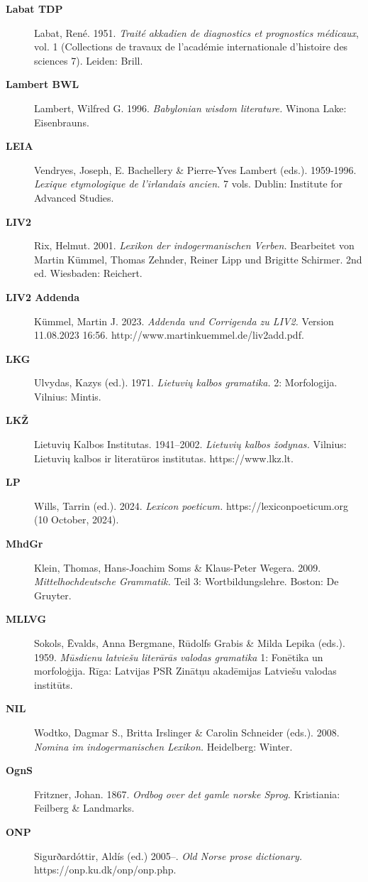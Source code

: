 \begin{description}
\item[\bfseries\upshape Labat TDP]Labat, René. 1951. \emph{Traité akkadien de diagnostics et prognostics médicaux}, vol. 1 (Collections de travaux de l’académie internationale d’histoire des sciences 7). Leiden: Brill.
\item[\bfseries\upshape Lambert BWL]Lambert, Wilfred G. 1996. \emph{Babylonian wisdom literature.} Winona Lake: Eisenbrauns.
\item[\bfseries\upshape LEIA]Vendryes, Joseph, E. Bachellery \& Pierre-Yves Lambert (eds.). 1959-1996. \emph{Lexique etymologique de l’irlandais ancien.} 7 vols. Dublin: Institute for Advanced Studies.
\item[\bfseries\upshape LIV2]Rix, Helmut. 2001. \emph{Lexikon der indogermanischen Verben.} Bearbeitet von Martin Kümmel, Thomas Zehnder, Reiner Lipp und Brigitte Schirmer. 2nd ed. Wiesbaden: Reichert.
\item[\bfseries\upshape LIV2 Addenda]Kümmel, Martin J. 2023. \emph{Addenda und Corrigenda zu LIV2.} Version 11.08.2023 16:56. http://www.martinkuemmel.de/liv2add.pdf.
\item[\bfseries\upshape LKG]Ulvydas, Kazys (ed.). 1971. \emph{Lietuvių kalbos gramatika.} 2: Morfologija. Vilnius: Mintis.
\item[\bfseries\upshape LKŽ]Lietuvių Kalbos Institutas. 1941–2002. \emph{Lietuvių kalbos žodynas.} Vilnius: Lietuvių kalbos ir literatūros institutas. https://www.lkz.lt.
\item[\bfseries\upshape LP]Wills, Tarrin (ed.). 2024. \emph{Lexicon poeticum.} https://lexiconpoeticum.org  (10 October, 2024).
\item[\bfseries\upshape MhdGr]Klein, Thomas, Hans-Joachim Soms \& Klaus-Peter Wegera. 2009. \emph{Mittelhochdeutsche Grammatik.} Teil 3: Wortbildungslehre. Boston: De Gruyter.
\item[\bfseries\upshape MLLVG]Sokols, Ēvalds, Anna Bergmane, Rūdolfs Grabis \& Milda Lepika (eds.). 1959. \emph{Mūsdienu latviešu literārās valodas gramatika} 1: Fonētika un morfoloģija. Rīga: Latvijas PSR Zinātņu akadēmijas Latviešu valodas institūts.
\item[\bfseries\upshape NIL]Wodtko, Dagmar S., Britta Irslinger \& Carolin Schneider (eds.). 2008. \emph{Nomina im indogermanischen Lexikon.} Heidelberg: Winter.
\item[\bfseries\upshape OgnS]Fritzner, Johan. 1867. \emph{Ordbog over det gamle norske Sprog.} Kristiania: Feilberg \& Landmarks.
\item[\bfseries\upshape ONP]Sigurðardóttir, Aldís (ed.) 2005–. \emph{Old Norse prose dictionary.} https://onp.ku.dk/onp/onp.php.

\end{description}

